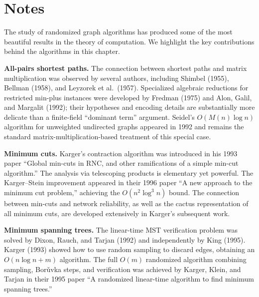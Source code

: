 \documentclass[twoside,12pt]{book}
\theoremstyle{plain}
\theoremstyle{definition}
\theoremstyle{remark}
\begin{document}
\section*{Notes}
\label{sec:notes-10}

The study of randomized graph algorithms has produced some of the most beautiful results in the theory of computation. We highlight the key contributions behind the algorithms in this chapter.

\textbf{All-pairs shortest paths.} The connection between shortest paths and matrix multiplication was observed by several authors, including Shimbel (1955), Bellman (1958), and Leyzorek et al.\ (1957). Specialized algebraic reductions for restricted min-plus instances were developed by Fredman (1975) and Alon, Galil, and Margalit (1992); their hypotheses and encoding details are substantially more delicate than a finite-field ``dominant term'' argument. Seidel's $O(M(n) \log n)$ algorithm for unweighted undirected graphs appeared in 1992 and remains the standard matrix-multiplication-based treatment of this special case.

\textbf{Minimum cuts.} Karger's contraction algorithm was introduced in his 1993 paper ``Global min-cuts in RNC, and other ramifications of a simple min-cut algorithm.'' The analysis via telescoping products is elementary yet powerful. The Karger--Stein improvement appeared in their 1996 paper ``A new approach to the minimum cut problem,'' achieving the $O(n^2 \log^3 n)$ bound. The connection between min-cuts and network reliability, as well as the cactus representation of all minimum cuts, are developed extensively in Karger's subsequent work.

\textbf{Minimum spanning trees.} The linear-time MST verification problem was solved by Dixon, Rauch, and Tarjan (1992) and independently by King (1995). Karger (1993) showed how to use random sampling to discard edges, obtaining an $O(n \log n + m)$ algorithm. The full $O(m)$ randomized algorithm combining sampling, Bor\v{u}vka steps, and verification was achieved by Karger, Klein, and Tarjan in their 1995 paper ``A randomized linear-time algorithm to find minimum spanning trees.''
\end{document}
